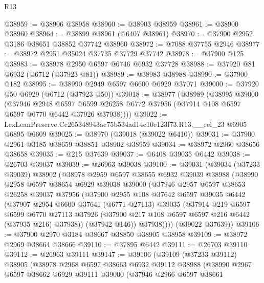 \begin{lexlean}{R13}
\begin{coremodule}
@38959 := @38906 @38958
@38960 := @38903 @38959
@38961 := @38900 @38960
@38964 := @38899 @38961 (@6407 @38961)
@38970 := @37900 @2952 @3186 @38651 @38852 @37742 @38960
@38972 := @7088 @37755 @2946
@38977 := @38972 @2951 @35024 @37735 @37729 @37742
@38978 := @37900 @125
@38983 := @38978 @2950 @6597 @6746 @6932 @37728
@38988 := @37920 @81 @6932 (@6712 (@37923 @81))
@38989 := @38983 @38988
@38990 := @37900 @182
@38995 := @38990 @2949 @6597 @6600 @6929 @37071
@39000 := @37920 @50 @6929 (@6712 (@37923 @50))
@39018 := @38977
    (@38989
      (@38995
        @39000
        (@37946
          @2948
          @6597
          @6599
          @26258
          @6772
          @37956
          (@37914 @108 @6597 @6597 @6770 @6442 @37926 @37938))))
@39022 := LexLeanPreserve.Cc265348943ac75b534ad14c10e123f73.R13.__rel_23 @6905 @6895 @6609
@39025 := @38970 (@39018 (@39022 @6410))
@39031 := @37900 @2961 @3185 @38659 @38851 @38902 @38959
@39034 := @38972 @2960 @38656 @38658
@39035 := @215 @37639
@39037 := @6408 @39035 @6442
@39038 := @26703 @39037
@39039 := @26963 @39038
@39100 := @39031
    (@39034
      (@37233 @39039)
      @38902
      (@38978
        @2959
        @6597
        @38655
        @6932
        @39039
        @38988
        (@38990
          @2958
          @6597
          @38654
          @6929
          @39038
          @39000
          (@37946
            @2957
            @6597
            @38653
            @26258
            @39037
            @37956
            (@37900
              @2955
              @108
              @37642
              @6597
              @39035
              @6442
              (@37907
                @2954
                @6600
                @37641
                (@6771 @27113)
                @39035
                (@37914
                  @219
                  @6597
                  @6599
                  @6770
                  @27113
                  @37926
                  (@37900 @217 @108 @6597 @6597 @216 @6442 (@37935 @216) @37938))
                (@37942 @146))
              @37938))))
      (@39022 @37639))
@39106 := @37900 @2970 @3184 @38667 @38850 @38905 @38958
@39109 := @38972 @2969 @38664 @38666
@39110 := @37895 @6442
@39111 := @26703 @39110
@39112 := @26963 @39111
@39147 := @39106
    (@39109
      (@37233 @39112)
      @38905
      (@38978
        @2968
        @6597
        @38663
        @6932
        @39112
        @38988
        (@38990
          @2967
          @6597
          @38662
          @6929
          @39111
          @39000
          (@37946
            @2966
            @6597
            @38661

\end{coremodule}
\end{lexlean}
